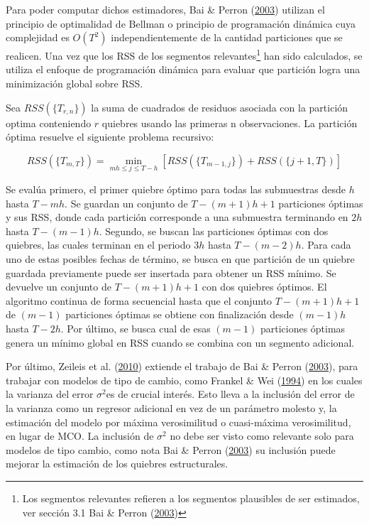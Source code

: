 \documentclass[12pt,oneside]{reedthesis}
\begin{document}
Para poder computar dichos estimadores, Bai \& Perron (\protect\hyperlink{ref-BaiPerron2003}{2003}) utilizan el principio de optimalidad de Bellman o principio de programación dinámica cuya complejidad es \(O(T^2)\) independientemente de la cantidad particiones que se realicen. Una vez que los RSS de los segmentos relevantes\footnote{Los segmentos relevantes refieren a los segmentos plausibles de ser estimados, ver sección 3.1 Bai \& Perron (\protect\hyperlink{ref-BaiPerron2003}{2003})} han sido calculados, se utiliza el enfoque de programación dinámica para evaluar que partición logra una minimización global sobre RSS.

Sea \(RSS(\{T_{r,n}\})\) la suma de cuadrados de residuos asociada con la partición optima conteniendo \(r\) quiebres usando las primeras n observaciones. La partición óptima resuelve el siguiente problema recursivo:

\[
RSS(\{T_{m,T}\}) = \min_{mh\leq j\leq T-h}[RSS(\{T_{m-1,j}\}) + RSS(\{j+1, T\})]
\]

Se evalúa primero, el primer quiebre óptimo para todas las submuestras desde \(h\) hasta \(T-mh\). Se guardan un conjunto de \(T-(m+1)h+1\) particiones óptimas y sus RSS, donde cada partición corresponde a una submuestra terminando en \(2h\) hasta \(T-(m-1)h\).
Segundo, se buscan las particiones óptimas con dos quiebres, las cuales terminan en el periodo \(3h\) hasta \(T-(m-2)h\). Para cada uno de estas posibles fechas de término, se busca en que partición de un quiebre guardada previamente puede ser insertada para obtener un RSS mínimo. Se devuelve un conjunto de \(T-(m+1)h+1\) con dos quiebres óptimos. El algoritmo continua de forma secuencial hasta que el conjunto \(T-(m+1)h+1\) de \((m-1)\) particiones óptimas se obtiene con finalización desde \((m-1)h\) hasta \(T-2h\). Por último, se busca cual de esas \((m-1)\) particiones óptimas genera un mínimo global en RSS cuando se combina con un segmento adicional.

Por último, Zeileis et al. (\protect\hyperlink{ref-Zeileis2010}{2010}) extiende el trabajo de Bai \& Perron (\protect\hyperlink{ref-BaiPerron2003}{2003}), para trabajar con modelos de tipo de cambio, como Frankel \& Wei (\protect\hyperlink{ref-Frankel1994}{1994}) en los cuales la varianza del error \(\sigma^2\)es de crucial interés. Esto lleva a la inclusión del error de la varianza como un regresor adicional en vez de un parámetro molesto y, la estimación del modelo por máxima verosimilitud o cuasi-máxima verosimilitud, en lugar de MCO. La inclusión de \(\sigma^2\) no debe ser visto como relevante solo para modelos de tipo cambio, como nota Bai \& Perron (\protect\hyperlink{ref-BaiPerron2003}{2003}) su inclusión puede mejorar la estimación de los quiebres estructurales.
\end{document}
